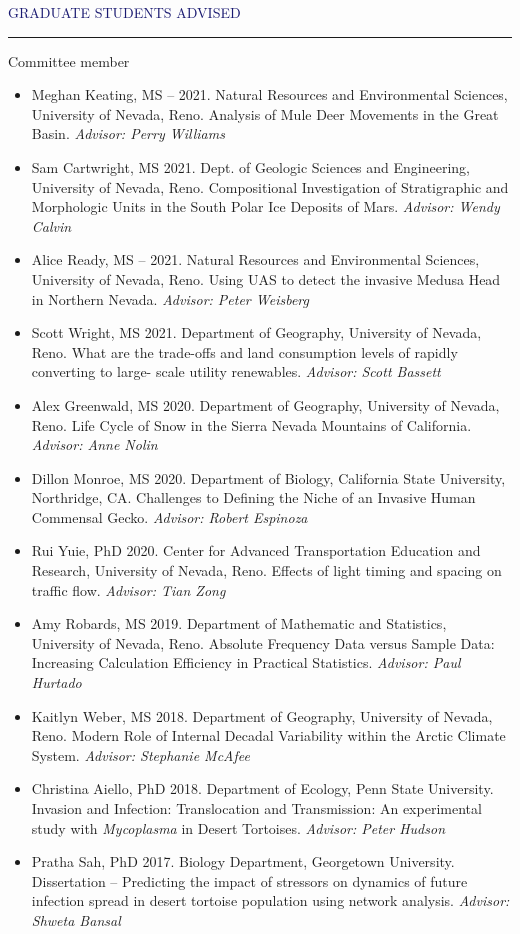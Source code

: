 \documentclass{resume} %
\renewenvironment{rSection}[1]{
\sectionskip
\textcolor{MidnightBlue}{\MakeUppercase{#1}}
\sectionlineskip
\hrule
\begin{list}{}{
\setlength{\leftmargin}{1.5em}
}
\item[]
}{
\end{list}
}
\begin{document}
\begin{rSection}{Graduate Students Advised}
\begin{rSubsection}{Committee member}{}{}{}
\begin{itemize}
   \item[] Meghan Keating, MS – 2021. Natural Resources and Environmental Sciences, University of Nevada, Reno. Analysis of Mule Deer Movements in the Great Basin. \textit{Advisor: Perry Williams}
   \item[] Sam Cartwright, MS 2021. Dept. of Geologic Sciences and Engineering, University of Nevada, Reno.  Compositional Investigation of Stratigraphic and Morphologic Units in the South Polar Ice Deposits of Mars. \textit{Advisor: Wendy Calvin}
   \item[] Alice Ready, MS – 2021. Natural Resources and Environmental Sciences, University of Nevada, Reno. Using UAS to detect the invasive Medusa Head in Northern Nevada. \textit{Advisor: Peter Weisberg}
   \item[] Scott Wright, MS 2021. Department of Geography, University of Nevada, Reno. What are the trade-offs and land consumption levels of rapidly converting to large- scale utility renewables. \textit{Advisor: Scott Bassett}
   \item[] Alex Greenwald, MS 2020. Department of Geography, University of Nevada, Reno. Life Cycle of Snow in the Sierra Nevada Mountains of California. \textit{Advisor: Anne Nolin}
   \item[] Dillon Monroe, MS 2020. Department of Biology, California State University, Northridge, CA. Challenges to Defining the Niche of an Invasive Human Commensal Gecko. \textit{Advisor: Robert Espinoza}
   \item[] Rui Yuie, PhD 2020. Center for Advanced Transportation Education and Research, University of Nevada, Reno.  Effects of light timing and spacing on traffic flow. \textit{Advisor: Tian Zong}
   \item[] Amy Robards, MS 2019. Department of Mathematic and Statistics, University of Nevada, Reno. Absolute Frequency Data versus Sample Data: Increasing Calculation Efficiency in Practical Statistics. \textit{Advisor: Paul Hurtado}
   \item[] Kaitlyn Weber, MS 2018. Department of Geography, University of Nevada, Reno. Modern Role of Internal Decadal Variability within the Arctic Climate System. \textit{Advisor: Stephanie McAfee}
   \item[]Christina Aiello, PhD 2018. Department of Ecology, Penn State University. Invasion and Infection: Translocation and Transmission: An experimental study with \textit {Mycoplasma} in Desert Tortoises. \textit{Advisor: Peter Hudson}
   \item[]Pratha Sah, PhD 2017. Biology Department, Georgetown University. Dissertation – Predicting the impact of stressors on dynamics of future infection spread in desert tortoise population using network analysis. \textit{Advisor: Shweta Bansal}

\end{itemize}
\end{rSubsection}
\end{rSection}
\end{document}
